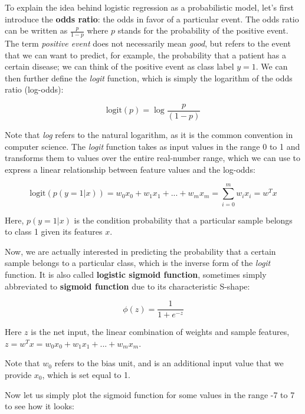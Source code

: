 \documentclass[11pt]{article}
\begin{document}
To explain the idea behind logistic regression as a probabilistic model,
let's first introduce the \textbf{odds ratio}: the odds in favor of a
particular event. The odds ratio can be written as \(\frac{p}{1-p}\)
where \(p\) stands for the probability of the positive event. The term
\emph{positive event} does not necessarily mean \emph{good}, but refers
to the event that we can want to predict, for example, the probability
that a patient has a certain disease; we can think of the positive event
as class label \(y = 1\). We can then further define the \emph{logit}
function, which is simply the logarithm of the odds ratio (log-odds):

\[\text{logit}(p) = \log\frac{p}{(1-p)}\]

Note that \emph{log} refers to the natural logarithm, as it is the
common convention in computer science. The \emph{logit} function takes
as input values in the range 0 to 1 and transforms them to values over
the entire real-number range, which we can use to express a linear
relationship between feature values and the log-odds:

\[\text{logit}(p(y = 1 | x)) = w_0x_0 + w_1x_1 + ... + w_mx_m = \sum_{i=0}^{m}w_ix_i = w^Tx\]

Here, \(p(y = 1 | x)\) is the condition probability that a particular
sample belongs to class 1 given its features \(x\).

Now, we are actually interested in predicting the probability that a
certain sample belongs to a particular class, which is the inverse form
of the \emph{logit} function. It is also called \textbf{logistic sigmoid
function}, sometimes simply abbreviated to \textbf{sigmoid function} due
to its characteristic S-shape:

\[\phi(z) = \frac{1}{1+e^{-z}}\]

Here \(z\) is the net input, the linear combination of weights and
sample features, \(z = w^Tx = w_0x_0 + w_1x_1 + ... + w_mx_m\).

Note that \(w_0\) refers to the bias unit, and is an additional input
value that we provide \(x_0\), which is set equal to 1.

    Now let us simply plot the sigmoid function for some values in the range
-7 to 7 to see how it looks:
\end{document}
